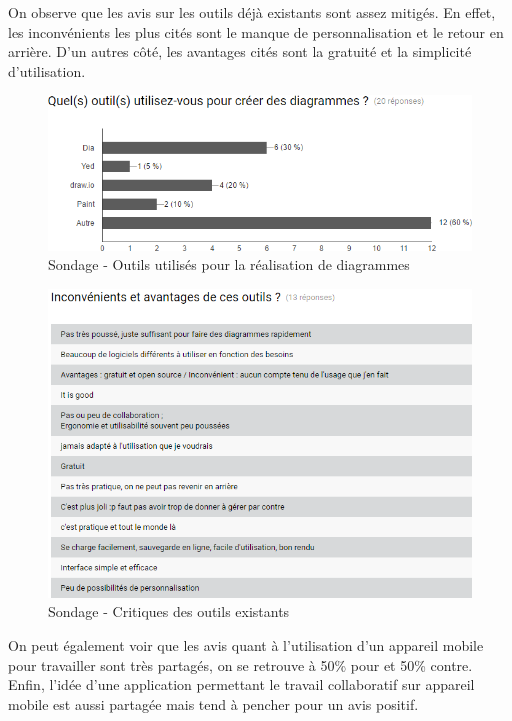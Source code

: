 On observe que les avis sur les outils déjà existants sont assez mitigés.
En effet, les inconvénients les plus cités sont le manque de personnalisation et le retour en arrière.
D'un autres côté, les avantages cités sont la gratuité et la simplicité d'utilisation. 

\newpage
\begin{figure}[!h]
	\centering
	\includegraphics[width=\textwidth]{img/sondage_outils}
	\caption{Sondage - Outils utilisés pour la réalisation de diagrammes}
\end{figure}
\vspace*{\fill}
\begin{figure}[!h]
	\centering
	\includegraphics[width=\textwidth]{img/sondage_critique}
	\caption{Sondage - Critiques des outils existants}
\end{figure}
\vspace*{\fill}

\newpage
On peut également voir que les avis quant à l'utilisation d'un appareil mobile pour travailler sont très partagés, on se retrouve à 50\% pour et 50\% contre.
Enfin, l'idée d'une application permettant le travail collaboratif sur appareil mobile est aussi partagée mais tend à pencher pour un avis positif.

